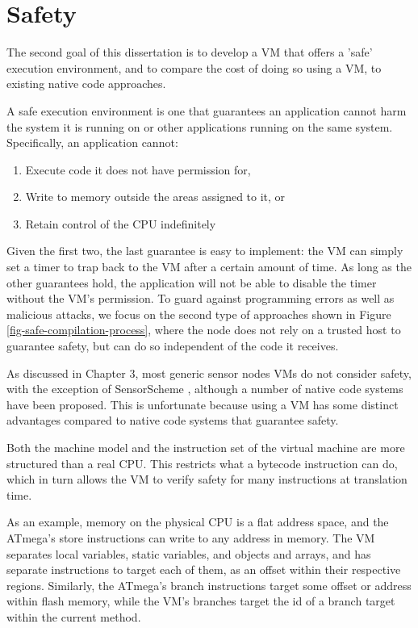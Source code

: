 \chapter{Safety}
\label{sec-safety}


The second goal of this dissertation is to develop a VM that offers a 'safe' execution environment, and to compare the cost of doing so using a VM, to existing native code approaches.

A safe execution environment is one that guarantees an application cannot harm the system it is running on or other applications running on the same system. Specifically, an application cannot:
\begin{enumerate}
    \item Execute code it does not have permission for,
    \item Write to memory outside the areas assigned to it, or
    \item Retain control of the CPU indefinitely
\end{enumerate}

Given the first two, the last guarantee is easy to implement: the VM can simply set a timer to trap back to the VM after a certain amount of time. As long as the other guarantees hold, the application will not be able to disable the timer without the VM's permission. To guard against programming errors as well as malicious attacks, we focus on the second type of approaches shown in Figure \ref{fig-safe-compilation-process}, where the node does not rely on a trusted host to guarantee safety, but can do so independent of the code it receives.

As discussed in Chapter 3, most generic sensor nodes VMs do not consider safety, with the exception of SensorScheme \cite{Evers:2010ur}, although a number of native code systems have been proposed. This is unfortunate because using a VM has some distinct advantages compared to native code systems that guarantee safety.

Both the machine model and the instruction set of the virtual machine are more structured than a real CPU. This restricts what a bytecode instruction can do, which in turn allows the VM to verify safety for many instructions at translation time.

As an example, memory on the physical CPU is a flat address space, and the ATmega's store instructions can write to any address in memory. The VM separates local variables, static variables, and objects and arrays, and has separate instructions to target each of them, as an offset within their respective regions. Similarly, the ATmega's branch instructions target some offset or address within flash memory, while the VM's branches target the id of a branch target within the current method.

